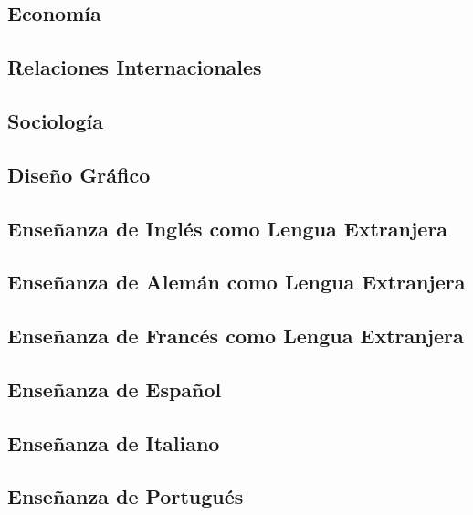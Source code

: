 \subsection{Economía}

\subsection{Relaciones Internacionales}

\subsection{Sociología}

\subsection{Diseño Gráfico}

\subsection{Enseñanza de Inglés como Lengua Extranjera}

\subsection{Enseñanza de Alemán como Lengua Extranjera}
\sincodigo

\subsection{Enseñanza de Francés como Lengua Extranjera}

\subsection{Enseñanza de Español}

\subsection{Enseñanza de Italiano}

\subsection{Enseñanza de Portugués}
\sincodigo

